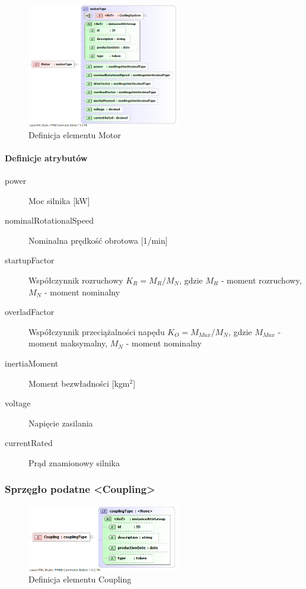 \documentclass[12pt,a4paper]{article}
\begin{document}
\begin{figure}[H]
  \centering
  \includegraphics[width=0.6\textwidth]{png/liquid/Motor}
  \caption{Definicja elementu Motor}
  \label{fig:motor-xsd}
\end{figure}

\paragraph{Definicje atrybutów}
\begin{description}
\item[power] Moc silnika [kW]
\item[nominalRotationalSpeed] Nominalna prędkość obrotowa [1/min]
\item[startupFactor] Współczynnik rozruchowy $K_R = M_R/M_N$,
	gdzie $M_R$ - moment rozruchowy, $M_N$ - moment nominalny
\item[overladFactor] Współczynnik przeciążalności napędu $K_O = M_{Max}/M_N$,
	gdzie $M_{Max}$ - moment maksymalny, $M_N$ - moment nominalny
\item[inertiaMoment] Moment bezwładności [kgm$^2$]
\item[voltage] Napięcie zasilania
\item[currentRated] Prąd znamionowy silnika
\end{description}

\subsubsection{Sprzęgło podatne <Coupling>}

\begin{figure}[H]
  \centering
  \includegraphics[width=0.6\textwidth]{png/liquid/Coupling}
  \caption{Definicja elementu Coupling}
  \label{fig:coupling-xsd}
\end{figure}
\end{document}
